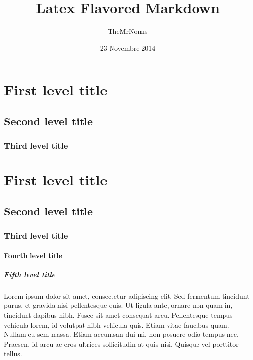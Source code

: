 \documentclass{report}
\begin{document}
    \begin{titlepage}
        \author{TheMrNomis}
        \title{Latex Flavored Markdown}
        \date{23 Novembre 2014}

        \maketitle
    \end{titlepage}
    
    

\section{First level title}

\subsection{Second level title}

\subsubsection{Third level title}

\section{First level title}

\subsection{Second level title}

\subsubsection{Third level title}

\paragraph{Fourth level title}

\subparagraph{Fifth level title}

Lorem ipsum dolor sit amet, consectetur adipiscing elit. Sed fermentum tincidunt purus, et gravida nisi pellentesque quis. Ut ligula ante, ornare non quam in, tincidunt dapibus nibh. Fusce sit amet consequat arcu. Pellentesque tempus vehicula lorem, id volutpat nibh vehicula quis. Etiam vitae faucibus quam. Nullam eu sem massa. Etiam accumsan dui mi, non posuere odio tempus nec. Praesent id arcu ac eros ultrices sollicitudin at quis nisi. Quisque vel porttitor tellus.
\end{document}
